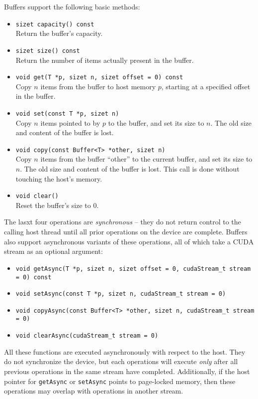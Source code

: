 \documentclass[11pt]{article}
\newcommand{\sizet}{size\textunderscore{}t}
\begin{document}
Buffers support the following basic methods:
\begin{itemize}
\item \texttt{\sizet{} capacity() const} \\
  Return the buffer's capacity.
  
\item \texttt{\sizet{} size() const} \\
  Return the number of items actually present in the buffer.

\item \texttt{void get(T *p, \sizet{} n, \sizet{} offset = 0) const} \\
  Copy $n$ items from the buffer to host memory $p$, starting at
  a specified offset in the buffer.

\item \texttt{void set(const T *p, \sizet{} n)} \\
  Copy $n$ items pointed to by $p$ to the buffer, and set its size to $n$.
  The old size and content of the buffer is lost. 

\item \texttt{void copy(const Buffer<T> *other, \sizet{} n)} \\
  Copy $n$ items from the buffer ``other'' to the current buffer, and set
  its size to $n$. The old size and content of the buffer is lost. 
  This call is done without touching the host's memory.

\item \texttt{void clear()} \\
  Reset the buffer's size to 0.

\end{itemize}
The lasxt four operations are \emph{synchronous} -- they do not return
control to the calling host thread until all prior operations on the
device are complete. Buffers also support asynchronous variants of these
operations, all of which take a CUDA stream as an optional argument:
\begin{itemize}

\item \texttt{void getAsync(T *p, \sizet{} n, \sizet{} offset = 0, cudaStream_t stream = 0) const}

\item \texttt{void setAsync(const T *p, \sizet{} n, cudaStream_t stream = 0)}

\item \texttt{void copyAsync(const Buffer<T> *other, \sizet{} n, cudaStream_t stream = 0)}

\item \texttt{void clearAsync(cudaStream_t stream = 0)}

\end{itemize}
All these functions are executed asynchronously with respect to the
host.  They do not synchronize the device, but each operations will
execute \emph{only} after all previous operations in the same stream
have completed.  Additionally, if the host pointer for
\texttt{getAsync} or \texttt{setAsync} points to page-locked memory,
then these operations may overlap with operations in another stream.
\end{document}
